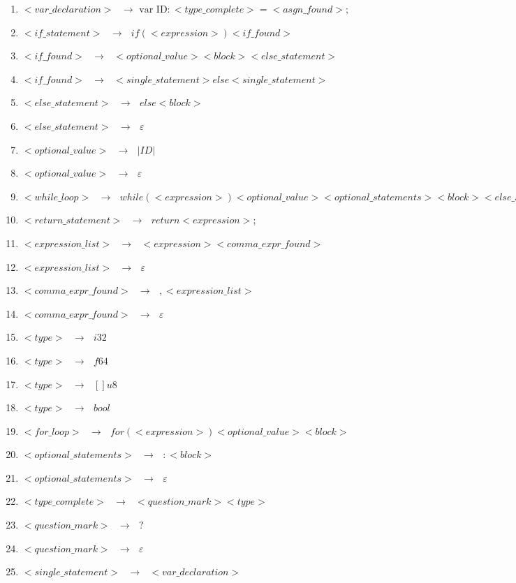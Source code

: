 \documentclass[12pt]{article}
\begin{document}
\begin{enumerate}
\item $<var\_declaration> \text{ }\to \text{ var ID} : <type\_complete> = <asgn\_found> ;$
\item $<if\_statement> \text{ }\to \text{ } if ( <expression> ) <if\_found>$
\item $<if\_found> \text{ }\to \text{ } <optional\_value> <block> <else\_statement>$
\item $<if\_found> \text{ }\to \text{ } <single\_statement> else <single\_statement>$
\item $<else\_statement> \text{ }\to \text{ } else <block>$
\item $<else\_statement> \text{ }\to \text{ } \varepsilon$
\item $<optional\_value> \text{ }\to \text{ } | ID |$
\item $<optional\_value> \text{ }\to \text{ } \varepsilon$
\item $<while\_loop> \text{ }\to \text{ } while ( <expression> ) <optional\_value> <optional\_statements> <block> <else\_statement>$
\item $<return\_statement> \text{ }\to \text{ } return <expression> ;$
\item $<expression\_list> \text{ }\to \text{ } <expression> <comma\_expr\_found>$
\item $<expression\_list> \text{ }\to \text{ } \varepsilon$
\item $<comma\_expr\_found> \text{ }\to \text{ } , <expression\_list>$ 
\item $<comma\_expr\_found> \text{ }\to \text{ } \varepsilon$
\item $<type> \text{ }\to \text{ } i32$
\item $<type> \text{ }\to \text{ } f64$
\item $<type> \text{ }\to \text{ } [] u8$
\item $<type> \text{ }\to \text{ } bool$
\item $<for\_loop> \text{ }\to \text{ } for ( <expression> ) <optional\_value> <block>$
\item $<optional\_statements> \text{ }\to \text{ } : <block>$ 
\item $<optional\_statements> \text{ }\to \text{ } \varepsilon$
\item $<type\_complete> \text{ }\to \text{ } <question\_mark> <type>$
\item $<question\_mark> \text{ }\to \text{ } ?$
\item $<question\_mark> \text{ }\to \text{ } \varepsilon$
\item $ <single\_statement> \text{ }\to \text{ } <var\_declaration>$

\end{enumerate}
\end{document}

